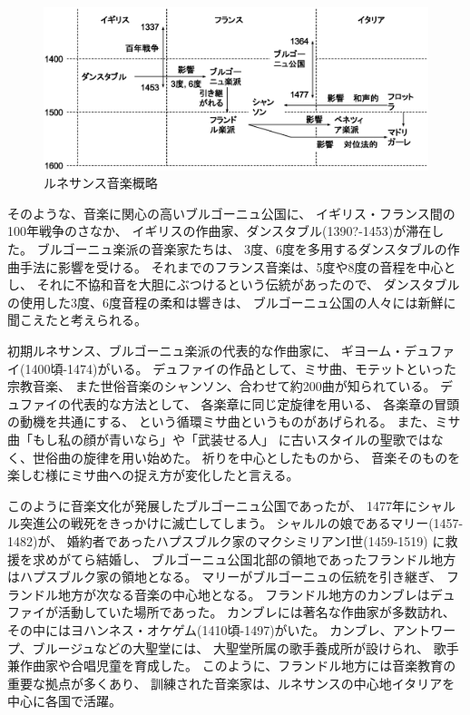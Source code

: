 \documentclass[a4j]{jarticle}
\begin{document}
\begin{figure}[tb]
 \begin{center}
  \includegraphics[width=\hsize]{fig/renaissance_summary.eps}
  \caption{ルネサンス音楽概略}
  \label{fig:renaissance_summary}
 \end{center}
\end{figure}

そのような、音楽に関心の高いブルゴーニュ公国に、
イギリス・フランス間の100年戦争のさなか、
イギリスの作曲家、ダンスタブル(1390?-1453)が滞在した。
ブルゴーニュ楽派の音楽家たちは、
3度、6度を多用するダンスタブルの作曲手法に影響を受ける。
それまでのフランス音楽は、5度や8度の音程を中心とし、
それに不協和音を大胆にぶつけるという伝統があったので、
ダンスタブルの使用した3度、6度音程の柔和は響きは、
ブルゴーニュ公国の人々には新鮮に聞こえたと考えられる。

初期ルネサンス、ブルゴーニュ楽派の代表的な作曲家に、
ギヨーム・デュファイ(1400頃-1474)がいる。
デュファイの作品として、ミサ曲、モテットといった宗教音楽、
また世俗音楽のシャンソン、合わせて約200曲が知られている。
デュファイの代表的な方法として、
各楽章に同じ定旋律を用いる、
各楽章の冒頭の動機を共通にする、
という循環ミサ曲というものがあげられる。
また、ミサ曲「もし私の顔が青いなら」や「武装せる人」
に古いスタイルの聖歌ではなく、世俗曲の旋律を用い始めた。
祈りを中心としたものから、
音楽そのものを楽しむ様にミサ曲への捉え方が変化したと言える。

このように音楽文化が発展したブルゴーニュ公国であったが、
1477年にシャルル突進公の戦死をきっかけに滅亡してしまう。
シャルルの娘であるマリー(1457-1482)が、
婚約者であったハプスブルク家のマクシミリアンI世(1459-1519)
に救援を求めがてら結婚し、
ブルゴーニュ公国北部の領地であったフランドル地方はハプスブルク家の領地となる。
マリーがブルゴーニュの伝統を引き継ぎ、
フランドル地方が次なる音楽の中心地となる。
フランドル地方のカンブレはデュファイが活動していた場所であった。
カンブレには著名な作曲家が多数訪れ、
その中にはヨハンネス・オケゲム(1410頃-1497)がいた。
カンブレ、アントワープ、ブルージュなどの大聖堂には、
大聖堂所属の歌手養成所が設けられ、
歌手兼作曲家や合唱児童を育成した。
このように、フランドル地方には音楽教育の重要な拠点が多くあり、
訓練された音楽家は、ルネサンスの中心地イタリアを中心に各国で活躍。
\end{document}
